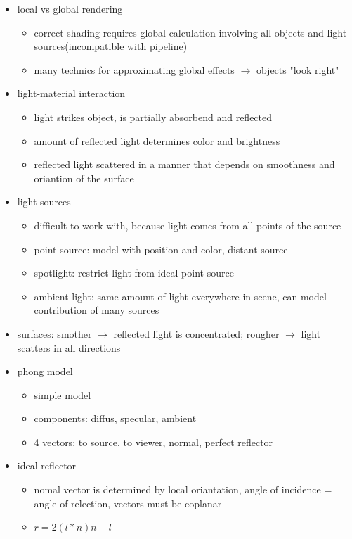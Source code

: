 \documentclass[11pt,a4paper]{article}
\begin{document}
\begin{itemize}
\begin{itemize}
	\end{itemize}
	\item local vs global rendering
	\begin{itemize}
		\item correct shading requires global calculation involving all objects and light sources(incompatible with pipeline)
		\item many technics for approximating global effects $\rightarrow$ objects "look right"
	\end{itemize}
	\item light-material interaction
	\begin{itemize}
		\item light strikes object, is partially absorbend and reflected
		\item amount of reflected light determines color and brightness
		\item reflected light scattered in a manner that depends on smoothness and oriantion of the surface
	\end{itemize}
	\item light sources
	\begin{itemize}
		\item difficult to work with, because light comes from all points of the source
		\item point source: model with position and color,  distant source
		\item spotlight: restrict light from ideal point source
		\item ambient light: same amount of light everywhere in scene, can model contribution of many sources
	\end{itemize}
	\item surfaces: smother $\rightarrow$  reflected light is concentrated; rougher $\rightarrow$ light scatters in all directions
	\item phong model
	\begin{itemize}
		\item simple model
		\item components: diffus, specular, ambient
		\item 4 vectors: to source, to viewer, normal, perfect reflector
	\end{itemize}
	\item ideal reflector
	\begin{itemize}
		\item nomal vector is determined by local oriantation, angle of incidence = angle of relection, vectors must be coplanar
		\item $r=2(l*n)n-l$

\end{itemize}
\end{itemize}
\end{document}
